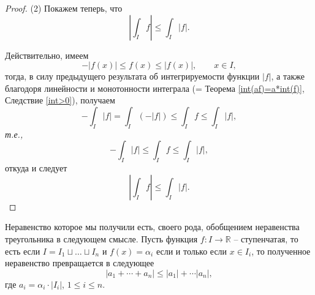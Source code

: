 \begin{proof}
(2) Покажем теперь, что 
\[
     \left| \int_I f \right| \le \int_I |f|.
    \]

Действительно, имеем
\[
 -|f(x)| \le f(x) \le |f(x)|, \qquad x \in I,
\]
тогда, в силу предыдущего результата об интегрируемости функции $|f|$, а также благодоря линейности и монотонности интеграла (= Теорема \ref{int(af)=a*int(f)}, Следствие \ref{int>0}), получаем
\[
 -\int_I |f|  = \int_I (-|f|) \le \int_I f \le \int_I |f|,
\]
\textit{т.е.,} 
\[
 -\int_I |f|  \le \int_I f \le \int_I |f|,
\]
откуда и следует 
\[
     \left| \int_I f \right| \le \int_I |f|.
\]
\end{proof}

\begin{remark}
    Неравенство которое мы получили есть, своего рода, обобщением неравенства треугольника в следующем смысле. Пусть функция $f:I \to \mathbb{R}$ -- ступенчатая, то есть если $I = I_1 \sqcup \ldots \sqcup I_n$ и $f(x) = \alpha_i$ если и только если $x \in I_i$, то полученное неравенство превращается в следующее
    \[
     \left| a_1 + \cdots + a_n \right| \le |a_1| + \cdots |a_n|,
    \]
    где $a_i = \alpha_i \cdot |I_i|$, $1\le i \le n.$
\end{remark}


















